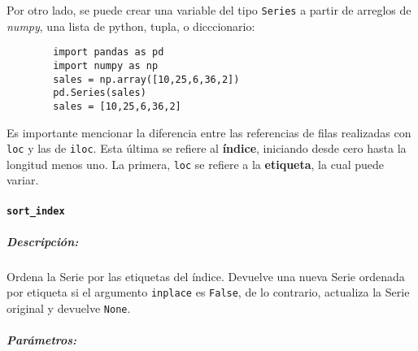 Por otro lado, se puede crear una variable del tipo \texttt{Series} a partir de
arreglos de \textit{numpy}, una lista de python, tupla, o dicccionario:

\begin{verbatim}
        import pandas as pd
        import numpy as np
        sales = np.array([10,25,6,36,2])
        pd.Series(sales)
        sales = [10,25,6,36,2]
        \end{verbatim}
Es importante mencionar la diferencia entre las referencias de filas realizadas
con \texttt{loc} y las de \texttt{iloc}. Esta última se refiere al
\textbf{índice}, iniciando desde cero hasta la longitud menos uno. La primera,
\texttt{loc} se refiere a la \textbf{etiqueta}, la cual puede variar.

\paragraph{\texttt{sort\_index}}

\subparagraph{Descripción:}
Ordena la Serie por las etiquetas del índice. Devuelve una nueva Serie ordenada
por etiqueta si el argumento \texttt{inplace} es \texttt{False}, de lo
contrario, actualiza la Serie original y devuelve \texttt{None}.

\subparagraph{Parámetros:}

